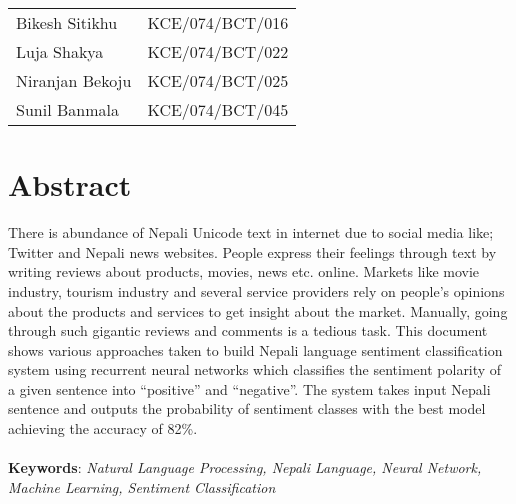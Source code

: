         \begin{tabular}{p{1.5in}p{3in}}
			Bikesh Sitikhu & KCE/074/BCT/016\\
			Luja Shakya & KCE/074/BCT/022\\
			Niranjan Bekoju & KCE/074/BCT/025\\
			Sunil Banmala & KCE/074/BCT/045\\
		\end{tabular}
		\break
		
		\large
			\chapter*{Abstract}
		\normalsize
		\justify
		There is abundance of Nepali Unicode text in internet due to social media like; Twitter
and Nepali news websites. People express their feelings through text by writing reviews
about products, movies, news etc. online. Markets like movie industry, tourism industry
and several service providers rely on people’s opinions about the products and services
to get insight about the market. Manually, going through such gigantic reviews and
comments is a tedious task. This document shows various approaches taken to build
Nepali language sentiment classification system using recurrent neural networks which
classifies the sentiment polarity of a given sentence into “positive” and “negative”. The
system takes input Nepali sentence and outputs the probability of sentiment classes with
the best model achieving the accuracy of 82\%.\\
        \vspace{0.1in}\\
		\textbf{Keywords}: 
		\textit{Natural Language Processing, Nepali Language, Neural Network, Machine Learning, Sentiment Classification}\\

		\break


	    \tableofcontents

		\listoftables
		\break
		\pagebreak

		\listoffigures
		\break
	
	
	
		\Large
			\begingroup
				\let\clearpage\relax

